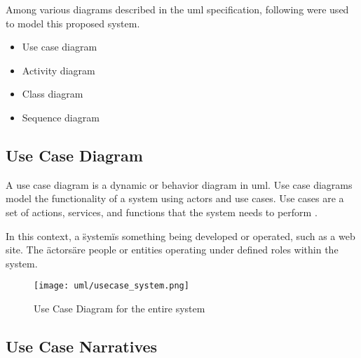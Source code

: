 \documentclass[12pt]{report}
\begin{document}
Among various diagrams described in the \acrshort{uml} specification, following were used to model this proposed system.

\begin{itemize}
	\item Use case diagram
	\item Activity diagram
	\item Class diagram
	\item Sequence diagram
\end{itemize}

\newpage
\subsection{Use Case Diagram}
A use case diagram is a dynamic or behavior diagram in \acrshort{uml}. Use case diagrams model the functionality of a system using actors and use cases. Use cases are a set of actions, services, and functions that the system needs to perform \cite{paradigm_2018_uml}.

In this context, a \"system\" is something being developed or operated, such as a web site. The \"actors\" are people or entities operating under defined roles within the system.

\begin{figure}[H]
	\centering
	\texttt{[image: uml/usecase\_system.png]}
	\caption{Use Case Diagram for the entire system}
\end{figure}

\newpage
\subsection{Use Case Narratives}
\end{document}
